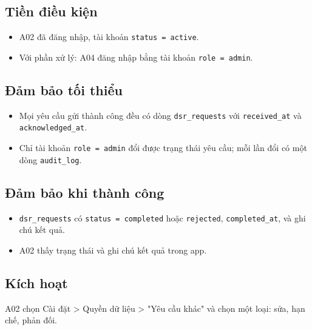 \subsection{Tiền điều kiện}
\begin{itemize}
\item A02 đã đăng nhập, tài khoản {\small\texttt{status = active}}.
\item Với phần xử lý: A04 đăng nhập bằng tài khoản {\small\texttt{role = admin}}.
\end{itemize}
\subsection{Đảm bảo tối thiểu}
\begin{itemize}
\item Mọi yêu cầu gửi thành công đều có dòng {\small\texttt{dsr\_\allowbreak{}\allowbreak{}requests}} với {\small\texttt{received\_\allowbreak{}\allowbreak{}at}} và {\small\texttt{acknowledged\_\allowbreak{}\allowbreak{}at}}.
\item Chỉ tài khoản {\small\texttt{role = admin}} đổi được trạng thái yêu cầu; mỗi lần đổi có một dòng {\small\texttt{audit\_\allowbreak{}\allowbreak{}log}}.
\end{itemize}
\subsection{Đảm bảo khi thành công}
\begin{itemize}
\item {\small\texttt{dsr\_\allowbreak{}\allowbreak{}requests}} có {\small\texttt{status = completed}} hoặc {\small\texttt{rejected}}, {\small\texttt{completed\_\allowbreak{}\allowbreak{}at}}, và ghi chú kết quả.
\item A02 thấy trạng thái và ghi chú kết quả trong app.
\end{itemize}
\subsection{Kích hoạt}
A02 chọn Cài đặt > Quyền dữ liệu > "Yêu cầu khác" và chọn một loại: sửa, hạn chế, phản đối.

